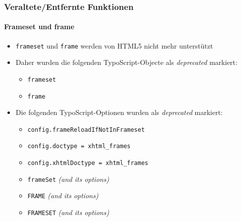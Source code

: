 \begin{frame}[fragile]
	\frametitle{Veraltete/Entfernte Funktionen}
	\framesubtitle{Frameset und frame}

	\begin{itemize}
		\item \texttt{frameset} und \texttt{frame} werden von HTML5 nicht mehr unterstützt
		\item Daher wurden die folgenden TypoScript-Objecte als \textit{deprecated} markiert:

			\begin{itemize}
				\item \texttt{frameset}
				\item \texttt{frame}
			\end{itemize}

		\item Die folgenden TypoScript-Optionen wurden als \textit{deprecated} markiert:

			\begin{itemize}
				\item \texttt{config.frameReloadIfNotInFrameset}
				\item \texttt{config.doctype = xhtml\_frames}
				\item \texttt{config.xhtmlDoctype = xhtml\_frames}
				\item \texttt{frameSet} \tabto{1.8cm}\textit{(and its options)}
				\item \texttt{FRAME} \tabto{1.8cm}\textit{(and its options)}
				\item \texttt{FRAMESET} \tabto{1.8cm}\textit{(and its options)}
			\end{itemize}

	\end{itemize}

\end{frame}






